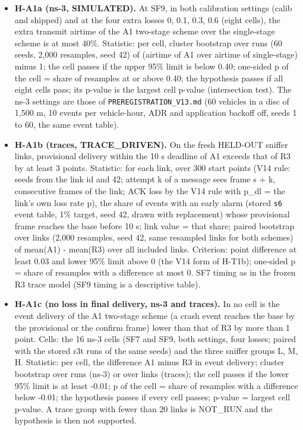 \begin{itemize}
\item \textbf{H-A1a (ns-3, SIMULATED).} At SF9, in both calibration settings (calib and shipped) and at the four extra losses 0, 0.1, 0.3, 0.6 (eight cells), the extra transmit airtime of the A1 two-stage scheme over the single-stage scheme is at most 40\%. Statistic: per cell, cluster bootstrap over runs (60 seeds, 2,000 resamples, seed 42) of (airtime of A1 over airtime of single-stage) minus 1; the cell passes if the upper 95\% limit is below 0.40; one-sided p of the cell = share of resamples at or above 0.40; the hypothesis passes if all eight cells pass; its p-value is the largest cell p-value (intersection test). The ns-3 settings are those of \texttt{PREREGISTRATION\_V13.md} (60 vehicles in a disc of 1,500 m, 10 events per vehicle-hour, ADR and application backoff off, seeds 1 to 60, the same event table).
\item \textbf{H-A1b (traces, TRACE\_DRIVEN).} On the fresh HELD-OUT sniffer links, provisional delivery within the 10 s deadline of A1 exceeds that of R3 by at least 3 points. Statistic: for each link, over 300 start points (V14 rule: seeds from the link id and 42; attempt k of a message sees frame s + k, consecutive frames of the link; ACK loss by the V14 rule with p\_dl = the link's own loss rate p), the share of events with an early alarm (stored \texttt{s6} event table, 1\% target, seed 42, drawn with replacement) whose provisional frame reaches the base before 10 s; link value = that share; paired bootstrap over links (2,000 resamples, seed 42, same resampled links for both schemes) of mean(A1) - mean(R3) over all included links. Criterion: point difference at least 0.03 and lower 95\% limit above 0 (the V14 form of H-T1b); one-sided p = share of resamples with a difference at most 0. SF7 timing as in the frozen R3 trace model (SF9 timing is a descriptive table).
\item \textbf{H-A1c (no loss in final delivery, ns-3 and traces).} In no cell is the event delivery of the A1 two-stage scheme (a crash event reaches the base by the provisional or the confirm frame) lower than that of R3 by more than 1 point. Cells: the 16 ns-3 cells (SF7 and SF9, both settings, four losses; paired with the stored r3t runs of the same seeds) and the three sniffer groups L, M, H. Statistic: per cell, the difference A1 minus R3 in event delivery; cluster bootstrap over runs (ns-3) or over links (traces); the cell passes if the lower 95\% limit is at least -0.01; p of the cell = share of resamples with a difference below -0.01; the hypothesis passes if every cell passes; p-value = largest cell p-value. A trace group with fewer than 20 links is NOT\_RUN and the hypothesis is then not supported.
\end{itemize}

